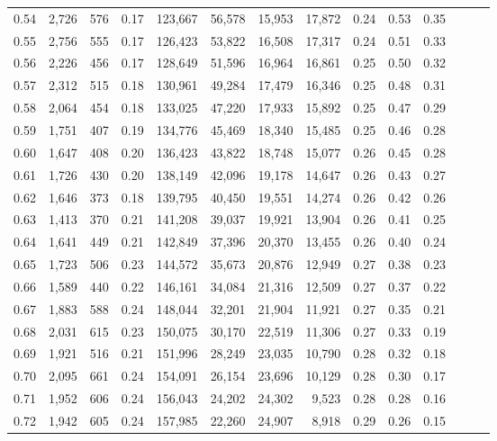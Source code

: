 \begin{tabular}{rrrrrrrrrrrrrr}
0.54 &  2,726 &  576 &  0.17 &  123,667 &   56,578 &  15,953 &  17,872 &  0.24 &  0.53 &      0.35 \\
0.55 &  2,756 &  555 &  0.17 &  126,423 &   53,822 &  16,508 &  17,317 &  0.24 &  0.51 &      0.33 \\
0.56 &  2,226 &  456 &  0.17 &  128,649 &   51,596 &  16,964 &  16,861 &  0.25 &  0.50 &      0.32 \\
0.57 &  2,312 &  515 &  0.18 &  130,961 &   49,284 &  17,479 &  16,346 &  0.25 &  0.48 &      0.31 \\
0.58 &  2,064 &  454 &  0.18 &  133,025 &   47,220 &  17,933 &  15,892 &  0.25 &  0.47 &      0.29 \\
0.59 &  1,751 &  407 &  0.19 &  134,776 &   45,469 &  18,340 &  15,485 &  0.25 &  0.46 &      0.28 \\
0.60 &  1,647 &  408 &  0.20 &  136,423 &   43,822 &  18,748 &  15,077 &  0.26 &  0.45 &      0.28 \\
0.61 &  1,726 &  430 &  0.20 &  138,149 &   42,096 &  19,178 &  14,647 &  0.26 &  0.43 &      0.27 \\
0.62 &  1,646 &  373 &  0.18 &  139,795 &   40,450 &  19,551 &  14,274 &  0.26 &  0.42 &      0.26 \\
0.63 &  1,413 &  370 &  0.21 &  141,208 &   39,037 &  19,921 &  13,904 &  0.26 &  0.41 &      0.25 \\
0.64 &  1,641 &  449 &  0.21 &  142,849 &   37,396 &  20,370 &  13,455 &  0.26 &  0.40 &      0.24 \\
0.65 &  1,723 &  506 &  0.23 &  144,572 &   35,673 &  20,876 &  12,949 &  0.27 &  0.38 &      0.23 \\
0.66 &  1,589 &  440 &  0.22 &  146,161 &   34,084 &  21,316 &  12,509 &  0.27 &  0.37 &      0.22 \\
0.67 &  1,883 &  588 &  0.24 &  148,044 &   32,201 &  21,904 &  11,921 &  0.27 &  0.35 &      0.21 \\
0.68 &  2,031 &  615 &  0.23 &  150,075 &   30,170 &  22,519 &  11,306 &  0.27 &  0.33 &      0.19 \\
0.69 &  1,921 &  516 &  0.21 &  151,996 &   28,249 &  23,035 &  10,790 &  0.28 &  0.32 &      0.18 \\
0.70 &  2,095 &  661 &  0.24 &  154,091 &   26,154 &  23,696 &  10,129 &  0.28 &  0.30 &      0.17 \\
0.71 &  1,952 &  606 &  0.24 &  156,043 &   24,202 &  24,302 &   9,523 &  0.28 &  0.28 &      0.16 \\
0.72 &  1,942 &  605 &  0.24 &  157,985 &   22,260 &  24,907 &   8,918 &  0.29 &  0.26 &      0.15 \\

\end{tabular}
